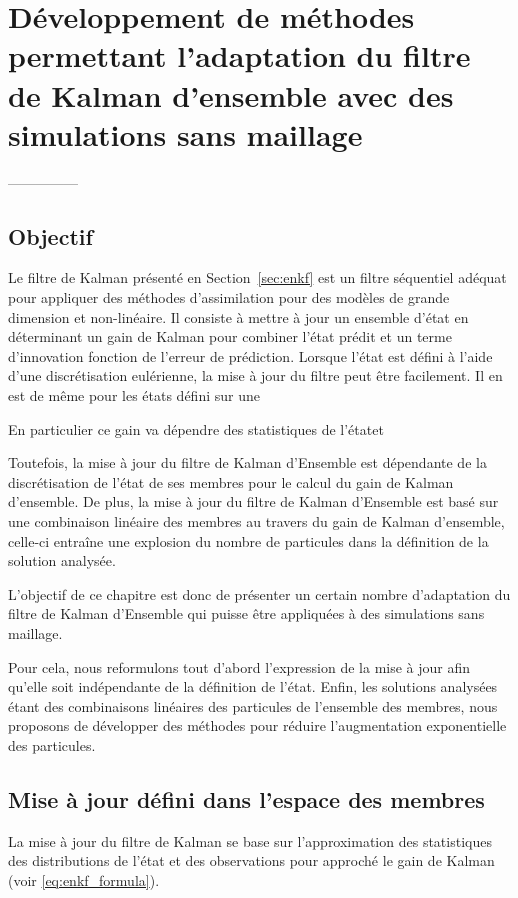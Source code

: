 \chapter{Développement de méthodes permettant l'adaptation du filtre de Kalman d'ensemble avec des simulations sans maillage}

---------------
\section{Objectif}
Le filtre de Kalman présenté en Section~\ref*{sec:enkf} est un filtre séquentiel adéquat pour appliquer des méthodes d'assimilation pour des modèles de grande dimension et non-linéaire. Il consiste à mettre à jour un ensemble d'état en déterminant un gain de Kalman pour combiner l'état prédit et un terme d'innovation fonction de l'erreur de prédiction. Lorsque l'état est défini à l'aide d'une discrétisation eulérienne, la mise à jour du filtre peut être facilement. Il en est de même pour les états défini sur une

%
%

En particulier ce gain va dépendre des statistiques de l'étatet

Toutefois, la mise à jour du filtre de Kalman d'Ensemble est dépendante de la discrétisation de l'état de ses membres pour le calcul du gain de Kalman d'ensemble. De plus, la mise à jour du filtre de Kalman d'Ensemble est basé sur une combinaison linéaire des membres au travers du gain de Kalman d'ensemble, celle-ci entraîne une explosion du nombre de particules dans la définition de la solution analysée.

L'objectif de ce chapitre est donc de présenter un certain nombre d'adaptation du filtre de Kalman d'Ensemble qui puisse être appliquées à des simulations sans maillage.

Pour cela, nous reformulons tout d'abord l'expression de la mise à jour afin qu'elle soit indépendante de la définition de l'état.
Enfin, les solutions analysées étant des combinaisons linéaires des particules de l'ensemble des membres, nous proposons de développer des méthodes pour réduire l'augmentation exponentielle des particules.

\section{Mise à jour défini dans l'espace des membres}

La mise à jour du filtre de Kalman se base sur l'approximation des statistiques des distributions de l'état et des observations pour approché le gain de Kalman (voir \eqref{eq:enkf_formula}).

